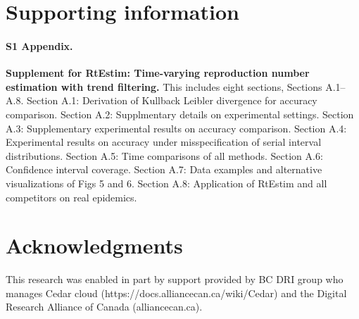 \documentclass[10pt,letterpaper]{article}
\begin{document}
\section*{Supporting information}

\paragraph*{S1 Appendix.}
\label{S1_supp}

{\bf Supplement for RtEstim: Time-varying reproduction number estimation with trend filtering.} 
This includes eight sections, Sections A.1--A.8. Section A.1: Derivation of Kullback Leibler divergence for accuracy comparison. 
Section A.2: Supplmentary details on experimental settings.
Section A.3: Supplementary experimental results on accuracy comparison.
Section A.4: Experimental results on accuracy under misspecification of serial interval distributions.
Section A.5: Time comparisons of all methods.
Section A.6: Confidence interval coverage.
Section A.7: Data examples and alternative visualizations of Figs 5 and 6.
Section A.8: Application of RtEstim and all competitors on real epidemics.

\section*{Acknowledgments}

This research was enabled in part by support provided by 
BC DRI group who manages Cedar cloud (https://docs.alliancecan.ca/wiki/Cedar)
and the Digital Research Alliance of Canada (alliancecan.ca).

\nolinenumbers
\end{document}
